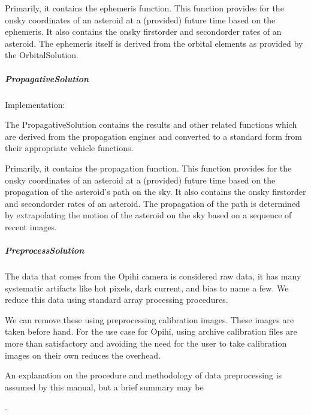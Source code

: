 \documentclass[letterpaper,11pt,english]{sphinxmanual}
\begin{document}
\sphinxAtStartPar
Primarily, it contains the ephemeris function. This function provides for the
on\sphinxhyphen{}sky coordinates of an asteroid at a (provided) future time based on the
ephemeris. It also contains the on\sphinxhyphen{}sky first\sphinxhyphen{}order and second\sphinxhyphen{}order rates of
an asteroid. The ephemeris itself is derived from the orbital elements as
provided by the OrbitalSolution.


\subparagraph{PropagativeSolution}
\label{\detokenize{technical/architecture/vehicles_solutions:propagativesolution}}
\sphinxAtStartPar
Implementation: {\hyperref[\detokenize{code/opihiexarata.propagate.solution:opihiexarata.propagate.solution.PropagativeSolution}]{}}

\sphinxAtStartPar
The PropagativeSolution contains the results and other related functions
which are derived from the propagation engines and converted to a standard
form from their appropriate vehicle functions.

\sphinxAtStartPar
Primarily, it contains the propagation function. This function provides for
the on\sphinxhyphen{}sky coordinates of an asteroid at a (provided) future time based on
the propagation of the asteroid’s path on the sky.  It also contains the
on\sphinxhyphen{}sky first\sphinxhyphen{}order and second\sphinxhyphen{}order rates of an asteroid. The propagation of
the path is determined by extrapolating the motion of the asteroid on the
sky based on a sequence of recent images.


\subparagraph{PreprocessSolution}
\label{\detokenize{technical/architecture/vehicles_solutions:preprocesssolution}}\label{\detokenize{technical/architecture/vehicles_solutions:technical-architecture-vehicles-solutions-preprocesssolution}}
\sphinxAtStartPar
The data that comes from the Opihi camera is considered raw data, it has many
systematic artifacts like hot pixels, dark current, and bias to name a few.
We reduce this data using standard array processing procedures.

\sphinxAtStartPar
We can remove these using preprocessing calibration images. These images
are taken before hand. For the use case for Opihi, using archive calibration
files are more than satisfactory and avoiding the need for the user to
take calibration images on their own reduces the overhead.

\sphinxAtStartPar
An explanation on the procedure and methodology of data preprocessing is
assumed by this manual, but a brief summary may be
%
\begin{footnote}[52]\sphinxAtStartFootnote
{}
%
\end{footnote}.
\end{document}
